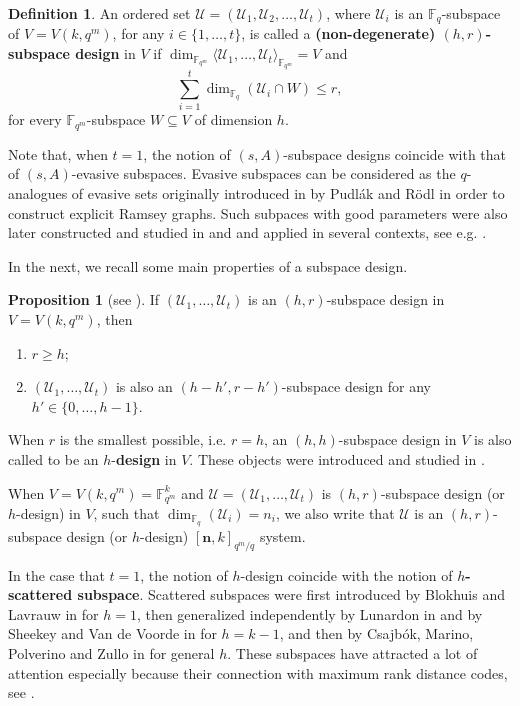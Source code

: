 \documentclass[11pt]{amsart}
\theoremstyle{definition}
\newtheorem{definition}[theorem]{Definition}
\newtheorem{proposition}[theorem]{Proposition}
\newcommand{\F}{{\mathbb F}}
\newcommand{\U}{{\mathcal{U}}}
\newcommand{\bfn}{\mathbf {n}}
\newcommand{\fq}{{\mathbb F}_{q}}
\begin{document}
\begin{definition}
An ordered set $\mathcal{U}=(\U_1,\U_2,\ldots,\U_t)$, where $\U_i$ is an $\F_q$-subspace of $V=V(k,q^m)$, for any $i \in \{1,\ldots,t\}$, is called a \textbf{(non-degenerate) $(h,r)$-subspace design} in $V$  if \newline $\dim_{\F_{q^m}} \langle \U_1,\ldots,\U_t \rangle_{\F_{q^m}} =V$ and  
$$\sum_{i=1}^t \dim_{\fq}(\U_i \cap W) \leq r,$$
for every $\F_{q^m}$-subspace $W \subseteq V$ of dimension $h$.
\end{definition}

Note that, when $t = 1$, the notion of $(s, A)$-subspace designs coincide with that of $(s, A)$-evasive subspaces. Evasive subspaces can be considered as the $q$-analogues of evasive sets originally introduced in \cite{pudlak2004pseudorandom} by Pudl\'ak and R\"{o}dl in order to
construct explicit Ramsey graphs. Such subpaces with good parameters were also later constructed and studied in \cite{dvir2012subspace} and \cite{bartoli2021evasive} and applied in several contexts, see e.g. \cite{guruswami2021lossless,guruswami2016explicit}.

In the next, we recall some main properties of a subspace design.

\begin{proposition} [see \textnormal{\cite[Proposition 1.3, Proposition 4.1]{santonastaso2022subspace}}]
\label{prop:diminuzione} 
If $(\U_1,\ldots,\U_t)$ is an $(h,r)$-subspace design in $V=V(k,q^m)$, then
\begin{enumerate}
    \item $r \geq h$;
    \item $(\U_1,\ldots,\U_t)$ is also an $(h-h',r-h')$-subspace design for any $h'\in \{0,\ldots,h-1\}$.
\end{enumerate}
\end{proposition}


When $r$ is the smallest possible, i.e. $r=h$, an $(h,h)$-subspace design in $V$ is also called to be an $h$-\textbf{design} in $V$. These objects were introduced and studied in \cite{santonastaso2022subspace}.

 When $V=V(k,q^m)=\F_{q^m}^k$ and $\U=(\U_1,\ldots,\U_t)$ is $(h,r)$-subspace design (or $h$-design) in $V$, such that $\dim_{\fq}(\U_i)=n_i$, we also write that $\U$ is an $(h,r)$-subspace design (or $h$-design) $[\bfn,k]_{q^m/q}$ system.


In the case that $t = 1$, the notion of $h$-design coincide with the notion of \textbf{$h$-scattered subspace}.
Scattered subspaces were first introduced by Blokhuis and Lavrauw in \cite{blokhuis2000scattered} for
$h =1$, then generalized independently by Lunardon in \cite{lunardon2017mrd} and by Sheekey and Van de Voorde in \cite{sheekeyVdV} for $h = k - 1$, and then by Csajb{\'o}k, Marino, Polverino and Zullo in \cite{csajbok2021generalising} for general $h$. These subspaces have attracted a lot of attention especially because their connection with maximum
rank distance codes, see \cite{polverino2020connections,marino2022evasive,sheekey2016new,zini2021scattered}.
\end{document}
